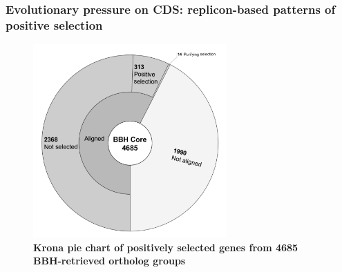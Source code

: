 \subsubsection{Evolutionary pressure on CDS: replicon-based patterns of positive selection}
\begin{figure}[!tb]
	\center
    \includegraphics[width=0.66\textwidth]{figures/4/thesis_29}
	\caption{\label{fig:positive}\textbf{Krona \cite{brian12interactive} pie chart of positively selected genes from 4685 BBH-retrieved ortholog groups}}
\end{figure}

